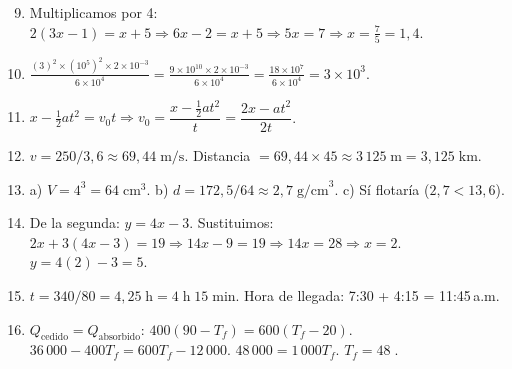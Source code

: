 \documentclass[12pt, letterpaper]{article}
\begin{document}
\begin{enumerate}[leftmargin=*, label=\textbf{\arabic*.}]
  \setcounter{enumi}{8}
  \item Multiplicamos por 4: $2(3x - 1) = x + 5 \Rightarrow 6x - 2 = x + 5 \Rightarrow 5x = 7 \Rightarrow x = \frac{7}{5} = 1{,}4$.

  \item $\frac{(3)^2 \times (10^5)^2 \times 2 \times 10^{-3}}{6 \times 10^4} = \frac{9 \times 10^{10} \times 2 \times 10^{-3}}{6 \times 10^4} = \frac{18 \times 10^7}{6 \times 10^4} = 3 \times 10^3$.

  \item $x - \frac{1}{2}at^2 = v_0 t \Rightarrow v_0 = \dfrac{x - \frac{1}{2}at^2}{t} = \dfrac{2x - at^2}{2t}$.

  \item $v = 250/3{,}6 \approx 69{,}44\;\text{m/s}$. Distancia $= 69{,}44 \times 45 \approx 3\,125\;\text{m} = 3{,}125\;\text{km}$.

  \item a) $V = 4^3 = 64\;\text{cm}^3$. b) $d = 172{,}5/64 \approx 2{,}7\;\text{g/cm}^3$. c) Sí flotaría ($2{,}7 < 13{,}6$).

  \item De la segunda: $y = 4x - 3$. Sustituimos: $2x + 3(4x - 3) = 19 \Rightarrow 14x - 9 = 19 \Rightarrow 14x = 28 \Rightarrow x = 2$. $y = 4(2) - 3 = 5$.

  \item $t = 340/80 = 4{,}25\;\text{h} = 4\;\text{h}\;15\;\text{min}$. Hora de llegada: 7:30 + 4:15 = 11:45\,a.m.

  \item $Q_{\text{cedido}} = Q_{\text{absorbido}}$: $400(90 - T_f) = 600(T_f - 20)$. $36\,000 - 400T_f = 600T_f - 12\,000$. $48\,000 = 1\,000T_f$. $T_f = 48\;$.
\end{enumerate}

\fi
\end{document}
